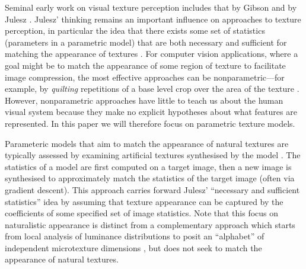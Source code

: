 \documentclass[article, 11pt,a4paper,natbib]{apa6}\usepackage[]{graphicx}\usepackage[]{color}
\begin{document}
Seminal early work on visual texture perception includes that by Gibson \citep{gibson_perception_1950, beck_relation_1955} and by Julesz \citep{julesz_visual_1962,julesz_visual_1978,julesz_textons_1981}. 
Julesz' thinking remains an important influence on approaches to texture perception, in particular the idea that there exists some set of statistics (parameters in a parametric model) that are both necessary and sufficient for matching the appearance of textures \citep[see also][]{portilla_parametric_2000}. 
For  computer vision applications, where a goal might be to match the appearance of some region of texture to facilitate image compression, the most effective approaches can be nonparametric---for example, by \textit{quilting} repetitions of a base level crop over the area of the texture \citep[e.g.][]{efros_image_2001}. 
However, nonparametric approaches have little to teach us about the human visual system because they make no explicit hypotheses about what features are represented.
In this paper we will therefore focus on parametric texture models.

Parameteric models that aim to match the appearance of natural textures are typically assessed by examining artificial textures synthesised by the model \citep{heeger_pyramidbased_1995, safranek_perceptually_1990, safranek_perceptually_1989, zhu_filters_1998, portilla_parametric_2000}. 
The statistics of a model are first computed on a target image, then a new image is synthesised to approximately match the statistics of the target image (often via gradient descent).
This approach carries forward Julesz' ``necessary and sufficient statistics'' idea by assuming that texture appearance can be captured by the coefficients of some specified set of image statistics.
Note that this focus on naturalistic appearance is distinct from a complementary approach which starts from local analysis of luminance distributions to posit an ``alphabet'' of independent microtexture dimensions \citep{victor_perception_2013}, but does not seek to match the appearance of natural textures.
\end{document}
